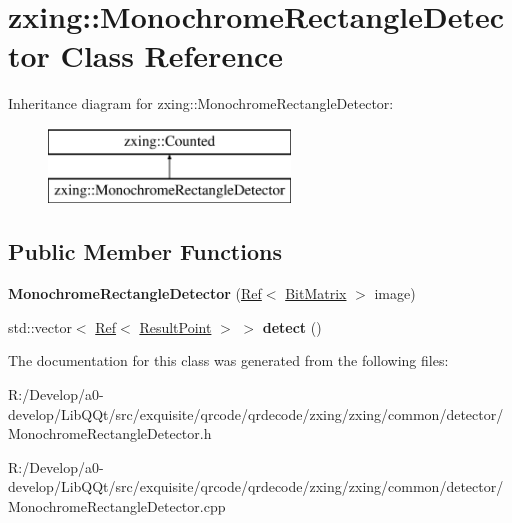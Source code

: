 \hypertarget{classzxing_1_1_monochrome_rectangle_detector}{}\section{zxing\+:\+:Monochrome\+Rectangle\+Detector Class Reference}
\label{classzxing_1_1_monochrome_rectangle_detector}
Inheritance diagram for zxing\+:\+:Monochrome\+Rectangle\+Detector\+:\begin{figure}[H]
\begin{center}
\leavevmode
\includegraphics[height=2.000000cm]{classzxing_1_1_monochrome_rectangle_detector}
\end{center}
\end{figure}
\subsection*{Public Member Functions}
\begin{DoxyCompactItemize}
\item 
\mbox{\label{classzxing_1_1_monochrome_rectangle_detector_a2c3747eac321ea2f0bca19e5950aa5b8}} 
{\bfseries Monochrome\+Rectangle\+Detector} (\mbox{\hyperlink{classzxing_1_1_ref}{Ref}}$<$ \mbox{\hyperlink{classzxing_1_1_bit_matrix}{Bit\+Matrix}} $>$ image)
\item 
\mbox{\label{classzxing_1_1_monochrome_rectangle_detector_ae8ae38f5aa89434b1e5315459d2e9a9e}} 
std\+::vector$<$ \mbox{\hyperlink{classzxing_1_1_ref}{Ref}}$<$ \mbox{\hyperlink{classzxing_1_1_result_point}{Result\+Point}} $>$ $>$ {\bfseries detect} ()
\end{DoxyCompactItemize}


The documentation for this class was generated from the following files\+:\begin{DoxyCompactItemize}
\item 
R\+:/\+Develop/a0-\/develop/\+Lib\+Q\+Qt/src/exquisite/qrcode/qrdecode/zxing/zxing/common/detector/Monochrome\+Rectangle\+Detector.\+h\item 
R\+:/\+Develop/a0-\/develop/\+Lib\+Q\+Qt/src/exquisite/qrcode/qrdecode/zxing/zxing/common/detector/Monochrome\+Rectangle\+Detector.\+cpp\end{DoxyCompactItemize}
